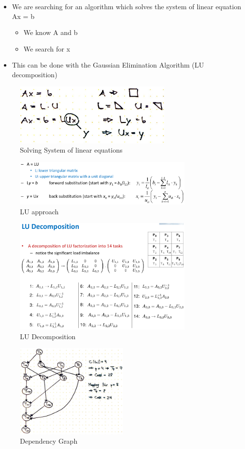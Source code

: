 \begin{itemize}
\tightlist
\item
  We are searching for an algorithm which solves the system of linear
  equation Ax = b

  \begin{itemize}
  \tightlist
  \item
    We know A and b
  \item
    We search for x
  \end{itemize}
\item
  This can be done with the Gaussian Elimination Algorithm (LU
  decomposition)
\end{itemize}

\begin{figure}[H]
\centering
\includegraphics[width=0.7\textwidth]{figures/linearEquations.png}
\caption{Solving System of linear equations}
\end{figure}

\begin{figure}[H]
\centering
\includegraphics[width=0.8\textwidth]{figures/LU1.png}
\caption{LU approach}
\end{figure}

\begin{figure}[H]
\centering
\includegraphics[width=0.8\textwidth]{figures/LU2.png}
\caption{LU Decomposition}
\end{figure}

\begin{figure}[H]
\centering
\includegraphics[width=0.5\textwidth]{figures/dependencyGraph.png}
\caption{Dependency Graph}
\end{figure}

\clearpage